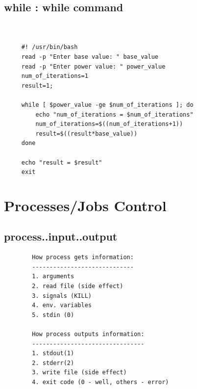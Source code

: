 \documentclass[a4paper,12pt]{article}
\begin{document}
\subsection{while   : while command}
\begin{verbatim}


     #! /usr/bin/bash
     read -p "Enter base value: " base_value
     read -p "Enter power value: " power_value
     num_of_iterations=1
     result=1;

     while [ $power_value -ge $num_of_iterations ]; do
         echo "num_of_iterations = $num_of_iterations"
         num_of_iterations=$((num_of_iterations+1))
         result=$((result*base_value))
     done

     echo "result = $result"
     exit 

\end{verbatim}

\section{Processes/Jobs Control }

\subsection{process..input..output  }
\begin{verbatim}
        How process gets information:
        -----------------------------
        1. arguments
        2. read file (side effect)
        3. signals (KILL)
        4. env. variables
        5. stdin (0)
        
        How process outputs information:
        --------------------------------
        1. stdout(1)
        2. stderr(2)
        3. write file (side effect)
        4. exit code (0 - well, others - error)

\end{verbatim}
\end{document}
